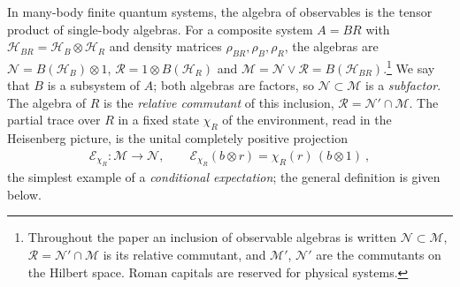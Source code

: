 \documentclass[a4paper,11pt]{article}
\theoremstyle{definition}
\newcommand{\mN}{\mathcal{N}}
\newcommand{\mM}{\mathcal{M}}
\begin{document}
In many-body finite quantum systems, the algebra of observables is the tensor product of single-body algebras. For a composite system $A=BR$ with $\mathcal H_{BR}=\mathcal H_B\otimes\mathcal H_R$ and density matrices $\rho_{BR},\rho_B,\rho_R$, the algebras are $\mathcal N=B(\mathcal H_B)\otimes1$, $\mathcal R=1\otimes B(\mathcal H_R)$ and $\mathcal M=\mathcal N\vee\mathcal R=B(\mathcal H_{BR})$.\footnote{Throughout the paper an inclusion of observable algebras is written $\mathcal N\subset\mathcal M$, $\mathcal R=\mathcal N'\cap\mathcal M$ is its relative commutant, and $\mathcal M'$, $\mathcal N'$ are the commutants on the Hilbert space. Roman capitals are reserved for physical systems.} We say that $B$ is a subsystem of $A$; both algebras are factors, so $\mathcal N\subset\mathcal M$ is a \emph{subfactor}. The algebra of $R$ is the \emph{relative commutant} of this inclusion, $\mathcal R=\mathcal N'\cap\mathcal M$.
The partial trace over $R$ in a fixed state $\chi_R$ of the environment, read in the Heisenberg picture, is the unital completely positive projection
\begin{align}
    \mathcal E_{\chi_R}:\mathcal M\to\mathcal N,\qquad
    \mathcal E_{\chi_R}(b\otimes r)=\chi_R(r)\,(b\otimes 1)\ ,
    \label{eq:slice-expectation-intro}
\end{align}
the simplest example of a \emph{conditional expectation}; the general definition is given below.
\end{document}
